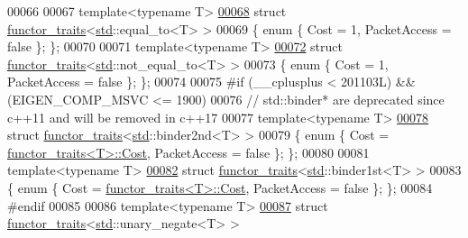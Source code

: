 \begin{DoxyCode}
00066 
00067 \textcolor{keyword}{template}<\textcolor{keyword}{typename} T>
\hyperlink{struct_eigen_1_1internal_1_1functor__traits_3_01std_1_1equal__to_3_01_t_01_4_01_4}{00068} \textcolor{keyword}{struct }\hyperlink{struct_eigen_1_1internal_1_1functor__traits}{functor\_traits}<\hyperlink{namespacestd}{std}::equal\_to<T> >
00069 \{ \textcolor{keyword}{enum} \{ Cost = 1, PacketAccess = \textcolor{keyword}{false} \}; \};
00070 
00071 \textcolor{keyword}{template}<\textcolor{keyword}{typename} T>
\hyperlink{struct_eigen_1_1internal_1_1functor__traits_3_01std_1_1not__equal__to_3_01_t_01_4_01_4}{00072} \textcolor{keyword}{struct }\hyperlink{struct_eigen_1_1internal_1_1functor__traits}{functor\_traits}<\hyperlink{namespacestd}{std}::not\_equal\_to<T> >
00073 \{ \textcolor{keyword}{enum} \{ Cost = 1, PacketAccess = \textcolor{keyword}{false} \}; \};
00074 
00075 \textcolor{preprocessor}{#if (\_\_cplusplus < 201103L) && (EIGEN\_COMP\_MSVC <= 1900)}
00076 \textcolor{comment}{// std::binder* are deprecated since c++11 and will be removed in c++17}
00077 \textcolor{keyword}{template}<\textcolor{keyword}{typename} T>
\hyperlink{struct_eigen_1_1internal_1_1functor__traits_3_01std_1_1binder2nd_3_01_t_01_4_01_4}{00078} \textcolor{keyword}{struct }\hyperlink{struct_eigen_1_1internal_1_1functor__traits}{functor\_traits}<\hyperlink{namespacestd}{std}::binder2nd<T> >
00079 \{ \textcolor{keyword}{enum} \{ Cost = \hyperlink{struct_eigen_1_1internal_1_1functor__traits}{functor\_traits<T>::Cost}, PacketAccess = \textcolor{keyword}{false} \}; \};
00080 
00081 \textcolor{keyword}{template}<\textcolor{keyword}{typename} T>
\hyperlink{struct_eigen_1_1internal_1_1functor__traits_3_01std_1_1binder1st_3_01_t_01_4_01_4}{00082} \textcolor{keyword}{struct }\hyperlink{struct_eigen_1_1internal_1_1functor__traits}{functor\_traits}<\hyperlink{namespacestd}{std}::binder1st<T> >
00083 \{ \textcolor{keyword}{enum} \{ Cost = \hyperlink{struct_eigen_1_1internal_1_1functor__traits}{functor\_traits<T>::Cost}, PacketAccess = \textcolor{keyword}{false} \}; \};
00084 \textcolor{preprocessor}{#endif}
00085 
00086 \textcolor{keyword}{template}<\textcolor{keyword}{typename} T>
\hyperlink{struct_eigen_1_1internal_1_1functor__traits_3_01std_1_1unary__negate_3_01_t_01_4_01_4}{00087} \textcolor{keyword}{struct }\hyperlink{struct_eigen_1_1internal_1_1functor__traits}{functor\_traits}<\hyperlink{namespacestd}{std}::unary\_negate<T> >

\end{DoxyCode}
